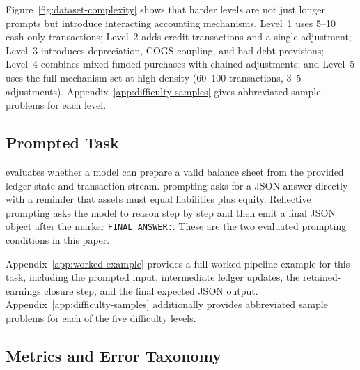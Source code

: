 Figure~\ref{fig:dataset-complexity} shows that harder levels are not
just longer prompts but introduce interacting accounting mechanisms.
Level~1 uses 5--10 cash-only transactions; Level~2 adds credit
transactions and a single adjustment; Level~3 introduces depreciation,
COGS coupling, and bad-debt provisions; Level~4 combines mixed-funded
purchases with chained adjustments; and Level~5 uses the full mechanism
set at high density (60--100 transactions, 3--5 adjustments).
Appendix~\ref{app:difficulty-samples} gives abbreviated sample problems
for each level.

\subsection{Prompted Task}

\benchmark{} evaluates whether a model can prepare a valid balance
sheet from the provided ledger state and transaction stream.
\zs{} prompting asks for a JSON answer directly with a reminder that
assets must equal liabilities plus equity.
Reflective \CoT{} prompting asks the model to reason step by step and
then emit a final JSON object after the marker
\texttt{FINAL ANSWER:}.
These are the two evaluated prompting conditions in this paper.

Appendix~\ref{app:worked-example} provides a full worked pipeline
example for this task, including the prompted input, intermediate
ledger updates, the retained-earnings closure step, and the final
expected JSON output.
Appendix~\ref{app:difficulty-samples} additionally provides abbreviated
sample problems for each of the five difficulty levels.

\subsection{Metrics and Error Taxonomy}


